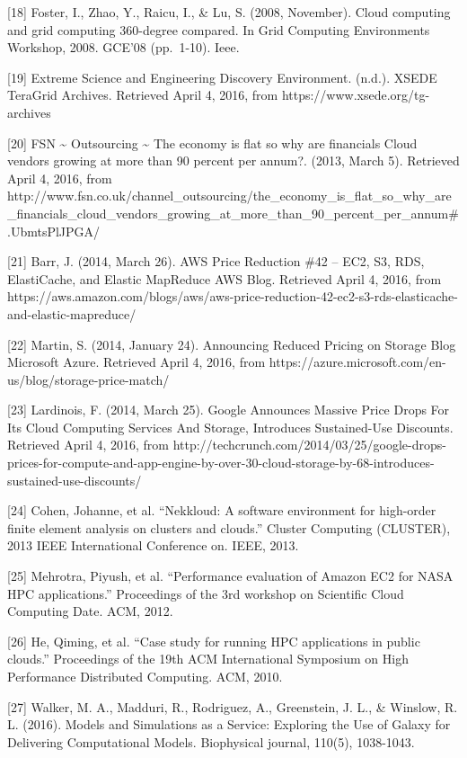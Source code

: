 \documentclass[]{article}
\begin{document}
{[}18{]} Foster, I., Zhao, Y., Raicu, I., \& Lu, S. (2008, November).
Cloud computing and grid computing 360-degree compared. In Grid
Computing Environments Workshop, 2008. GCE'08 (pp.~1-10). Ieee.

{[}19{]} Extreme Science and Engineering Discovery Environment. (n.d.).
XSEDE \textbar{} TeraGrid Archives. Retrieved April 4, 2016, from
https://www.xsede.org/tg-archives

{[}20{]} FSN \textasciitilde{} Outsourcing \textasciitilde{} The economy
is flat so why are financials Cloud vendors growing at more than 90
percent per annum?. (2013, March 5). Retrieved April 4, 2016, from
http://www.fsn.co.uk/channel\_outsourcing/the\_economy\_is\_flat\_so\_why\_are\_financials\_cloud\_vendors\_growing\_at\_more\_than\_90\_percent\_per\_annum\#.UbmtsPlJPGA/

{[}21{]} Barr, J. (2014, March 26). AWS Price Reduction \#42 -- EC2, S3,
RDS, ElastiCache, and Elastic MapReduce \textbar{} AWS Blog. Retrieved
April 4, 2016, from
https://aws.amazon.com/blogs/aws/aws-price-reduction-42-ec2-s3-rds-elasticache-and-elastic-mapreduce/

{[}22{]} Martin, S. (2014, January 24). Announcing Reduced Pricing on
Storage \textbar{} Blog \textbar{} Microsoft Azure. Retrieved April 4,
2016, from https://azure.microsoft.com/en-us/blog/storage-price-match/

{[}23{]} Lardinois, F. (2014, March 25). Google Announces Massive Price
Drops For Its Cloud Computing Services And Storage, Introduces
Sustained-Use Discounts. Retrieved April 4, 2016, from
http://techcrunch.com/2014/03/25/google-drops-prices-for-compute-and-app-engine-by-over-30-cloud-storage-by-68-introduces-sustained-use-discounts/

{[}24{]} Cohen, Johanne, et al. ``Nekkloud: A software environment for
high-order finite element analysis on clusters and clouds.'' Cluster
Computing (CLUSTER), 2013 IEEE International Conference on. IEEE, 2013.

{[}25{]} Mehrotra, Piyush, et al. ``Performance evaluation of Amazon EC2
for NASA HPC applications.'' Proceedings of the 3rd workshop on
Scientific Cloud Computing Date. ACM, 2012.

{[}26{]} He, Qiming, et al. ``Case study for running HPC applications in
public clouds.'' Proceedings of the 19th ACM International Symposium on
High Performance Distributed Computing. ACM, 2010.

{[}27{]} Walker, M. A., Madduri, R., Rodriguez, A., Greenstein, J. L.,
\& Winslow, R. L. (2016). Models and Simulations as a Service: Exploring
the Use of Galaxy for Delivering Computational Models. Biophysical
journal, 110(5), 1038-1043.
\end{document}
